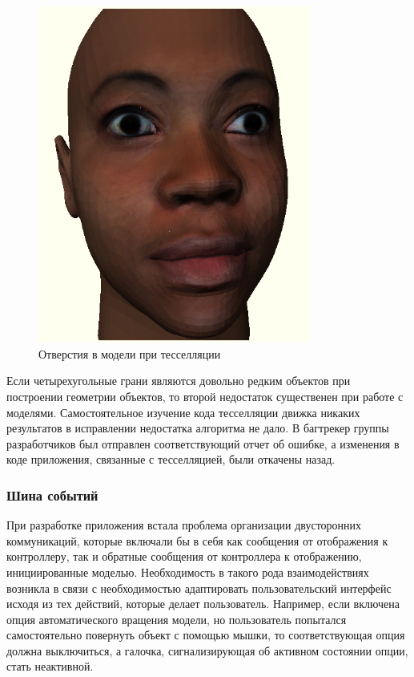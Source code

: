 \documentclass[12pt, a4paper]{article}
\begin{document}
\begin{figure}[htb]
\centering
\includegraphics[width=0.8\textwidth]{holes-in-model.png}
\caption{Отверстия в модели при тесселляции}
\label{fig:holes-in-model}
\end{figure}

Если четырехугольные грани являются довольно редким объектов при построении
геометрии объектов, то второй недостаток существенен при работе с моделями.
Самостоятельное изучение кода тесселляции движка никаких результатов в
исправлении недостатка алгоритма не дало. В багтрекер группы разработчиков был
отправлен соответствующий отчет об ошибке, а изменения в коде приложения,
связанные с тесселляцией, были откачены назад.

\subsubsection{Шина событий}
При разработке приложения встала проблема организации двусторонних коммуникаций,
которые включали бы в себя как сообщения от отображения к контроллеру, так и
обратные сообщения от контроллера к отображению, инициированные моделью.
Необходимость в такого рода взаимодействиях возникла в связи с необходимостью
адаптировать пользовательский интерфейс исходя из тех действий, которые делает
пользователь. Например, если включена опция автоматического вращения модели,
но пользователь попытался самостоятельно повернуть объект с помощью мышки, то
соответствующая опция должна выключиться, а галочка, сигнализирующая об активном
состоянии опции, стать неактивной.
\end{document}
